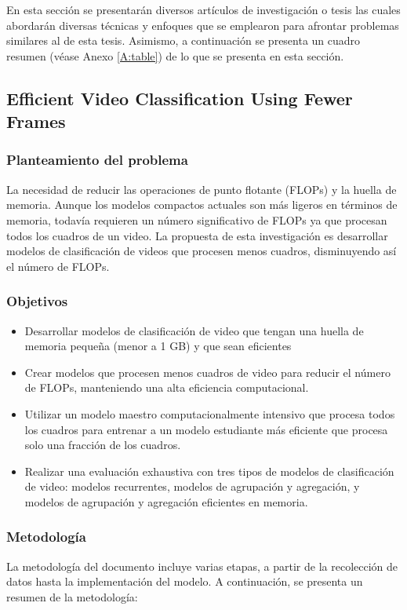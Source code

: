 En esta sección se presentarán diversos artículos de investigación o tesis las cuales abordarán diversas técnicas y enfoques que se emplearon para afrontar problemas similares al de esta tesis. Asimismo, a continuación se presenta un cuadro resumen (véase Anexo \ref{A:table}) de lo que se presenta en esta sección.


\subsection{Efficient Video Classification Using Fewer Frames}
\cite{bhardwaj2019efficient}
\subsubsection{Planteamiento del problema}
La necesidad de reducir las operaciones de punto flotante (FLOPs) y la huella de memoria. Aunque los modelos compactos actuales son más ligeros en términos de memoria, todavía requieren un número significativo de FLOPs ya que procesan todos los cuadros de un video. La propuesta de esta investigación es desarrollar modelos de clasificación de videos que procesen menos cuadros, disminuyendo así el número de FLOPs.
\subsubsection{Objetivos}

\begin{itemize}
	\item Desarrollar modelos de clasificación de video que tengan una huella de memoria pequeña (menor a 1 GB) y que sean eficientes 
	\item Crear modelos que procesen menos cuadros de video para reducir el número de FLOPs, manteniendo una alta eficiencia computacional.
	\item Utilizar un modelo maestro computacionalmente intensivo que procesa todos los cuadros para entrenar a un modelo estudiante más eficiente que procesa solo una fracción de los cuadros.
	\item Realizar una evaluación exhaustiva con tres tipos de modelos de clasificación de video: modelos recurrentes, modelos de agrupación y agregación, y modelos de agrupación y agregación eficientes en memoria.
\end{itemize}

\subsubsection {Metodología}
La metodología del documento incluye varias etapas, a partir de la recolección de datos hasta la implementación del modelo. A continuación, se presenta un resumen de la metodología:

